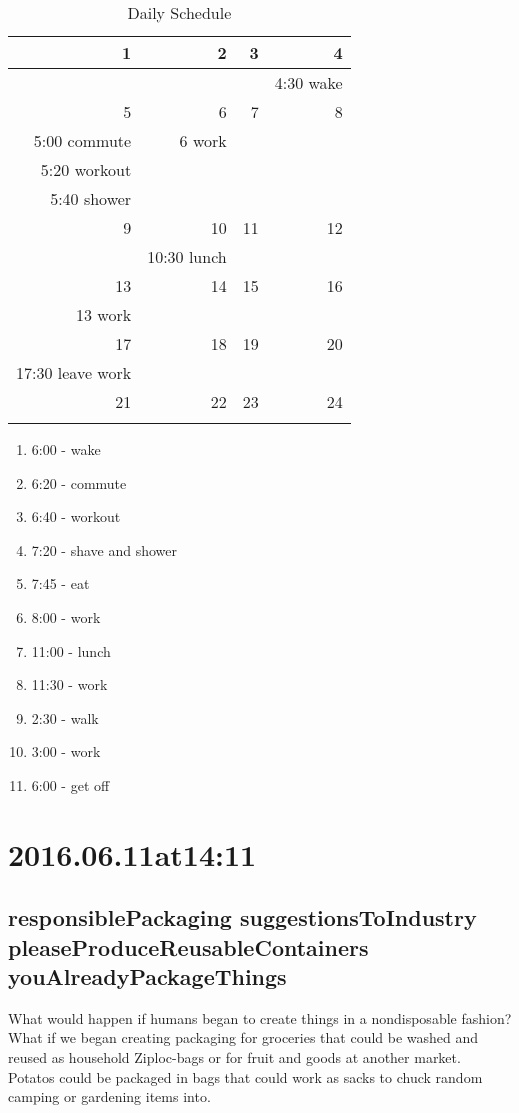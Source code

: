 \begin{table}
\caption{\label{tab:2016.06.01DailySchedule}Daily Schedule}
\begin{tabular}{|r|r|r|r|}
  \hline
  1&2&3&4\\
  \hline
  &&&4:30 wake\\
  \hline
  5&6&7&8\\
  \hline
  5:00 commute&6 work&&\\
  5:20 workout&&&\\
  5:40 shower&&&\\
  \hline
  9&10&11&12\\
  \hline
  &10:30 lunch&&\\
  \hline
  13&14&15&16\\
  \hline
  13 work&&&\\
  \hline
  17&18&19&20\\
  \hline
  17:30 leave work&&&\\
  \hline
  21&22&23&24\\
  \hline
  &&&\\
  \hline
\end{tabular}\end{table}

\begin{enumerate}
\item 6:00 - wake
\item 6:20 - commute
\item 6:40 - workout
\item 7:20 - shave and shower
\item 7:45 - eat
\item 8:00 - work
\item 11:00 - lunch
\item 11:30 - work
\item 2:30 - walk
\item 3:00 - work
\item 6:00 - get off
\end{enumerate}

\section*{ 2016.06.11at14:11 }
\subsection*{responsiblePackaging suggestionsToIndustry pleaseProduceReusableContainers youAlreadyPackageThings}
What would happen if humans began to create things in a nondisposable fashion? What if we began creating packaging for groceries that could be washed and reused as household Ziploc-bags or for fruit and goods at another market. Potatos could be packaged in bags that could work as sacks to chuck random camping or gardening items into.

